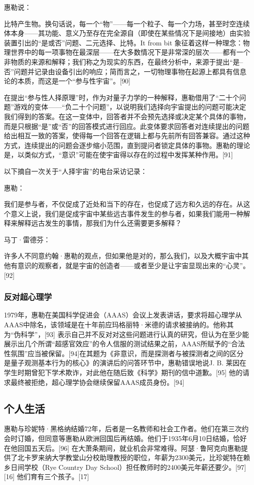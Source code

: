 惠勒说：

比特产生物。换句话说，每一个“物”——每一个粒子、每一个力场，甚至时空连续体本身——其功能、意义乃至存在完全源自（即使在某些情况下是间接地）由实验装置引出的“是或否”问题、二元选择、比特。It from bit 象征着这样一种理念：物理世界中的每一项事物在最深层——在大多数情况下是非常深的层次——都有一个非物质的来源和解释；我们称之为现实的东西，在最终分析中，来源于提出“是–否”问题并记录由设备引出的响应；简而言之，一切物理事物在起源上都具有信息论的本质，而这是一个“参与性宇宙”。[90]

在提出“参与性人择原理”时，作为对量子力学的一种解释，惠勒借用了“二十个问题”游戏的变体——“负二十个问题”，以说明我们选择向宇宙提出的问题可能决定我们得到的答案。在这一变体中，回答者并不会预先选择或决定某个具体的事物，而是只根据“是”或“否”的回答模式进行回应。此变体要求回答者对连续提出的问题给出相互一致的答案，使得每一个回答在逻辑上都与先前所有回答兼容。通过这种方式，连续提出的问题会逐步缩小范围，直到提问者锁定具体的事物。惠勒的理论是，以类似方式，“意识”可能在使宇宙得以存在的过程中发挥某种作用。[91]

以下摘自一次关于“人择宇宙”的电台采访记录：

惠勒：

我们是参与者，不仅促成了近处和当下的存在，也促成了远方和久远的存在。从这个意义上说，我们是促成宇宙中某些远古事件发生的参与者，如果我们能用一种解释来解释远古发生的事情，那我们为什么还需要更多解释？

马丁·雷德芬：

许多人不同意约翰·惠勒的观点，但如果他是对的，那么我们，以及大概宇宙中其他有意识的观察者，就是宇宙的创造者——或者至少是让宇宙显现出来的“心灵”。[92]
\subsubsection{反对超心理学}
1979年，惠勒在美国科学促进会（AAAS）会议上发表讲话，要求将超心理学从AAAS中除名，该领域是在十年前应玛格丽特·米德的请求被接纳的。他称其为“伪科学”，[93] 表示自己并不反对对这些问题进行认真的研究，但认为在至少能展示出几个所谓“超感官效应”的令人信服的测试结果之前，AAAS所赋予的“合法性氛围”应当被保留。[94]在其题为《非意识，而是探测者与被探测者之间的区分是量子观测基本行为的核心》的演讲后的问答环节中，惠勒错误地说J. B. 莱因在学生时期曾犯下学术欺诈，对此他在随后致《科学》期刊的信中道歉。[95] 他的请求最终被拒绝，超心理学协会继续保留AAAS成员身份。[94]
\subsection{个人生活}
惠勒与珍妮特·黑格纳结婚72年，后者是一名教师和社会工作者。他们在第三次约会时订婚，但同意等惠勒从欧洲回国后再结婚。他们于1935年6月10日结婚，恰好在他回国五天后。[96] 在大萧条期间，就业机会非常难得。阿瑟·鲁阿克向惠勒提供了北卡罗来纳大学教堂山分校助理教授的职位，年薪为2300美元，比珍妮特在赖乡日间学校（Rye Country Day School）担任教师时的2400美元年薪还要少。[97][16] 他们育有三个孩子。[17]

